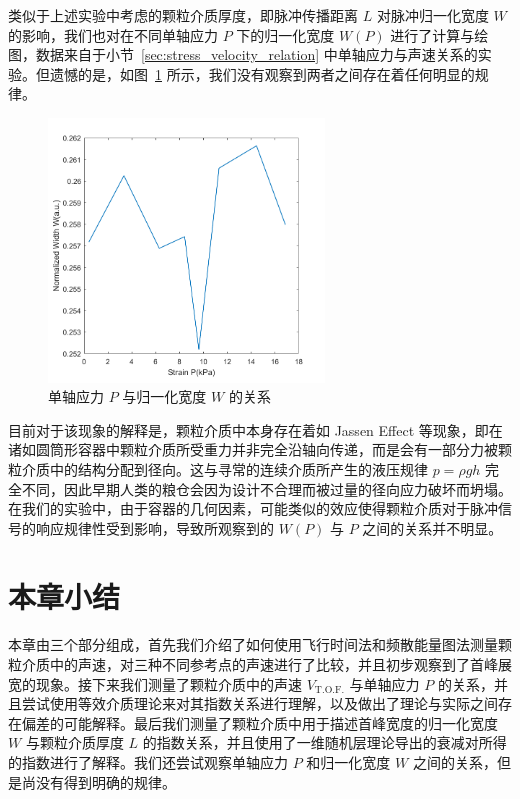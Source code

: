 类似于上述实验中考虑的颗粒介质厚度，即脉冲传播距离 $L$ 对脉冲归一化宽度 $W$ 的影响，我们也对在不同单轴应力 $P$ 下的归一化宽度 $W(P)$ 进行了计算与绘图，数据来自于小节~\ref{sec:stress_velocity_relation} 中单轴应力与声速关系的实验。但遗憾的是，如图~\ref{fig:normalized_width_versus_P} 所示，我们没有观察到两者之间存在着任何明显的规律。

\begin{figure}[!hbtp]
  \centering
  \includegraphics[height=7cm]{figures/2_W_norm&Strain.png}
  \caption{单轴应力 $P$ 与归一化宽度 $W$ 的关系}%
  \label{fig:normalized_width_versus_P}
\end{figure}

目前对于该现象的解释是，颗粒介质中本身存在着如 Jassen Effect 等现象，即在诸如圆筒形容器中颗粒介质所受重力并非完全沿轴向传递，而是会有一部分力被颗粒介质中的结构分配到径向。这与寻常的连续介质所产生的液压规律 $p=\rho gh$ 完全不同，因此早期人类的粮仓会因为设计不合理而被过量的径向应力破坏而坍塌\cite{sperlExperimentsCornPressure2006}。在我们的实验中，由于容器的几何因素，可能类似的效应使得颗粒介质对于脉冲信号的响应规律性受到影响，导致所观察到的 $W(P)$ 与 $P$ 之间的关系并不明显。

\section{本章小结}

本章由三个部分组成，首先我们介绍了如何使用飞行时间法和频散能量图法测量颗粒介质中的声速，对三种不同参考点的声速进行了比较，并且初步观察到了首峰展宽的现象。接下来我们测量了颗粒介质中的声速 $V_{\text{T.O.F.}}$ 与单轴应力 $P$ 的关系，并且尝试使用等效介质理论来对其指数关系进行理解，以及做出了理论与实际之间存在偏差的可能解释。最后我们测量了颗粒介质中用于描述首峰宽度的归一化宽度 $W$ 与颗粒介质厚度 $L$ 的指数关系，并且使用了一维随机层理论导出的衰减对所得的指数进行了解释。我们还尝试观察单轴应力 $P$ 和归一化宽度 $W$ 之间的关系，但是尚没有得到明确的规律。